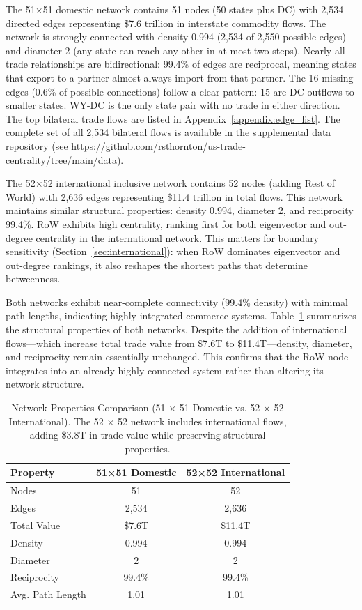 \documentclass[12pt,oneside]{book}
\begin{document}
The 51×51 domestic network contains 51 nodes (50 states plus DC) with 2,534 directed edges representing \$7.6 trillion in interstate commodity flows. The network is strongly connected with density 0.994 (2,534 of 2,550 possible edges) and diameter 2 (any state can reach any other in at most two steps). Nearly all trade relationships are bidirectional: 99.4\% of edges are reciprocal, meaning states that export to a partner almost always import from that partner. The 16 missing edges (0.6\% of possible connections) follow a clear pattern: 15 are DC outflows to smaller states. WY-DC is the only state pair with no trade in either direction. The top bilateral trade flows are listed in Appendix~\ref{appendix:edge_list}. The complete set of all 2,534 bilateral flows is available in the supplemental data repository (see \url{https://github.com/rsthornton/us-trade-centrality/tree/main/data}).

The 52$\times$52 international inclusive network contains 52 nodes (adding Rest of World) with 2,636 edges representing \$11.4 trillion in total flows. This network maintains similar structural properties: density 0.994, diameter 2, and reciprocity 99.4\%. RoW exhibits high centrality, ranking first for both eigenvector and out-degree centrality in the international network. This matters for boundary sensitivity (Section~\ref{sec:international}): when RoW dominates eigenvector and out-degree rankings, it also reshapes the shortest paths that determine betweenness. 

Both networks exhibit near-complete connectivity (99.4\% density) with minimal path lengths, indicating highly integrated commerce systems. Table~\ref{tab:network_properties} summarizes the structural properties of both networks. Despite the addition of international flows---which increase total trade value from \$7.6T to \$11.4T---density, diameter, and reciprocity remain essentially unchanged. This confirms that the RoW node integrates into an already highly connected system rather than altering its network structure. 

\begin{table}[ht]
  \centering
  \caption[Network Properties Comparison (51 $\times$ 51 Domestic vs.\ 52 $\times$ 52 International).]{Network Properties Comparison (51 $\times$ 51 Domestic vs. 52 $\times$ 52 International). The 52 $\times$ 52 network includes
  international flows, adding \$3.8T in trade value while preserving structural properties.}
  \label{tab:network_properties}
  \begin{tabular}{lcc}
  \hline
  \textbf{Property} & \textbf{51×51 Domestic} & \textbf{52×52 International} \\
  \hline
  Nodes & 51 & 52 \\
  Edges & 2,534 & 2,636 \\
  Total Value & \$7.6T & \$11.4T \\
  Density & 0.994 & 0.994 \\
  Diameter & 2 & 2 \\
  Reciprocity & 99.4\% & 99.4\% \\
  Avg. Path Length & 1.01 & 1.01 \\
  \hline
  \end{tabular}
\end{table}
\end{document}
